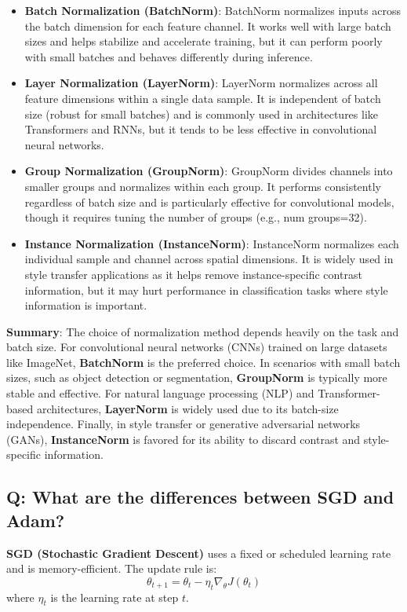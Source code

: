 \begin{itemize}
	\item \textbf{Batch Normalization (BatchNorm)}: BatchNorm normalizes inputs across the batch dimension for each feature channel. It works well with large batch sizes and helps stabilize and accelerate training, but it can perform poorly with small batches and behaves differently during inference.
	
	\item \textbf{Layer Normalization (LayerNorm)}: LayerNorm normalizes across all feature dimensions within a single data sample. It is independent of batch size (robust for small batches) and is commonly used in architectures like Transformers and RNNs, but it tends to be less effective in convolutional neural networks.
	
	\item \textbf{Group Normalization (GroupNorm)}: GroupNorm divides channels into smaller groups and normalizes within each group. It performs consistently regardless of batch size and is particularly effective for convolutional models, though it requires tuning the number of groups (e.g., num groups=32).
	
	\item \textbf{Instance Normalization (InstanceNorm)}: InstanceNorm normalizes each individual sample and channel across spatial dimensions. It is widely used in style transfer applications as it helps remove instance-specific contrast information, but it may hurt performance in classification tasks where style information is important.
\end{itemize}

\textbf{Summary}: The choice of normalization method depends heavily on the task and batch size. For convolutional neural networks (CNNs) trained on large datasets like ImageNet, \textbf{BatchNorm} is the preferred choice. In scenarios with small batch sizes, such as object detection or segmentation, \textbf{GroupNorm} is typically more stable and effective. For natural language processing (NLP) and Transformer-based architectures, \textbf{LayerNorm} is widely used due to its batch-size independence. Finally, in style transfer or generative adversarial networks (GANs), \textbf{InstanceNorm} is favored for its ability to discard contrast and style-specific information.

\subsection*{\textcolor{primaryteal}{Q: What are the differences between SGD and Adam?}}
\textbf{SGD (Stochastic Gradient Descent)} uses a fixed or scheduled learning rate and is memory-efficient. The update rule is:
\[
\theta_{t+1} = \theta_t - \eta_t \nabla_\theta J(\theta_t)
\]
where $\eta_t$ is the learning rate at step $t$.

